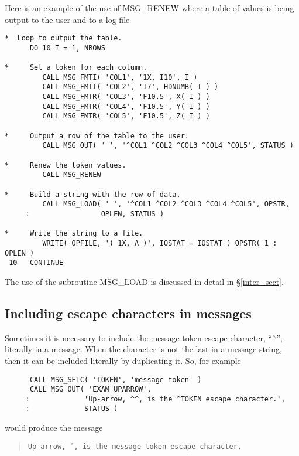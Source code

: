 Here is an example of the use of MSG\_RENEW where a table of values is being
output to the user and to a log file

\begin {small}
\begin{verbatim}
*  Loop to output the table.
      DO 10 I = 1, NROWS

*     Set a token for each column.
         CALL MSG_FMTI( 'COL1', '1X, I10', I )
         CALL MSG_FMTI( 'COL2', 'I7', HDNUMB( I ) )
         CALL MSG_FMTR( 'COL3', 'F10.5', X( I ) )
         CALL MSG_FMTR( 'COL4', 'F10.5', Y( I ) )
         CALL MSG_FMTR( 'COL5', 'F10.5', Z( I ) )

*     Output a row of the table to the user.
         CALL MSG_OUT( ' ', '^COL1 ^COL2 ^COL3 ^COL4 ^COL5', STATUS )

*     Renew the token values.
         CALL MSG_RENEW

*     Build a string with the row of data.
         CALL MSG_LOAD( ' ', '^COL1 ^COL2 ^COL3 ^COL4 ^COL5', OPSTR,
     :                 OPLEN, STATUS )

*     Write the string to a file.
         WRITE( OPFILE, '( 1X, A )', IOSTAT = IOSTAT ) OPSTR( 1 : OPLEN )
 10   CONTINUE
\end{verbatim}
\end {small}

The use of the subroutine MSG\_LOAD is discussed in detail in
\S\ref{inter_sect}.


\subsection {Including escape characters in messages}

Sometimes it is necessary to include the message token escape character,
``$^\wedge$'', literally in a message. 
When the character is not the last in a message string, then it can be included
literally by duplicating it.
So, for example

\begin {small}
\begin{verbatim}
      CALL MSG_SETC( 'TOKEN', 'message token' )
      CALL MSG_OUT( 'EXAM_UPARROW', 
     :             'Up-arrow, ^^, is the ^TOKEN escape character.', 
     :             STATUS )
\end{verbatim}
\end {small}

would produce the message

\begin {quote}
\begin {small}
\begin{verbatim}
Up-arrow, ^, is the message token escape character.
\end{verbatim}
\end {small}
\end {quote}

